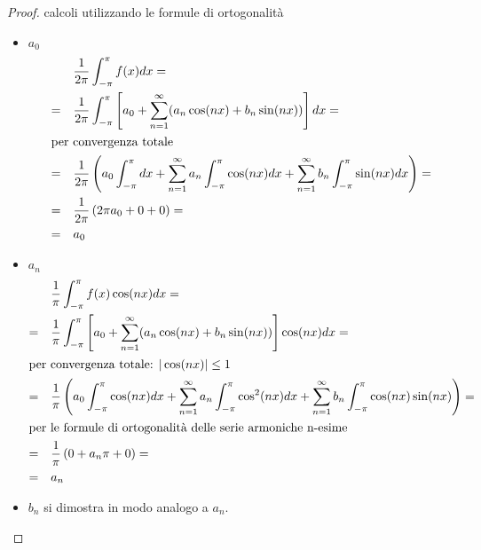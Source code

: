 \documentclass[12pt, a4paper]{article}
\theoremstyle{break}
\begin{document}
\begin{proof} calcoli utilizzando le formule di ortogonalità
	\begin{itemize}
		\item $a_0$
		      \begin{align*}
			              & \frac{1}{2\pi} \int_{-\pi}^{\pi} f(x) dx =           \\
			      = \quad & \frac{1}{2\pi} \int_{-\pi}^{\pi} \left[a_0 +
			      \sum_{n=1}^{\infty} (a_n \cos(nx) + b_n \sin(nx))\right] dx  = \\
			      \intertext{per convergenza totale}
			      = \quad & \frac{1}{2\pi} \left( a_0 \int_{-\pi}^{\pi} dx +
			      \sum_{n=1}^{\infty} a_n \int_{-\pi}^{\pi} \cos(nx) dx +
			      \sum_{n=1}^{\infty} b_n \int_{-\pi}^{\pi} \sin(nx) dx \right)
			      =                                                              \\
			      = \quad & \frac{1}{2\pi} \left( 2\pi a_0 + 0 + 0 \right)   =   \\
			      = \quad & a_0
		      \end{align*}
		\item $a_n$
		      \begin{align*}
			              & \frac{1}{\pi} \int_{-\pi}^{\pi} f(x) \cos(nx) dx =       \\
			      = \quad & \frac{1}{\pi} \int_{-\pi}^{\pi} \left[a_0 +
			      \sum_{n=1}^{\infty} (a_n \cos(nx) + b_n \sin(nx))\right]
			      \cos(nx) dx =                                                      \\
			      \intertext{per convergenza totale: $| \cos(nx) | \leq 1$ }
			      = \quad & \frac{1}{\pi} \left( a_0 \int_{-\pi}^{\pi} \cos(nx) dx +
			      \sum_{n=1}^{\infty} a_n \int_{-\pi}^{\pi} \cos^2(nx) dx +
			      \sum_{n=1}^{\infty} b_n \int_{-\pi}^{\pi} \cos(nx) \sin(nx)
			      \right)                                                 =          \\
			      \intertext{per le formule di ortogonalità delle serie armoniche
				      n-esime}
			      = \quad & \frac{1}{\pi} \left( 0 + a_n \pi + 0 \right)  =          \\
			      = \quad & a_n
		      \end{align*}
		\item $b_n$ si dimostra in modo analogo a $a_n$.
	\end{itemize}
\end{proof}
\end{document}
